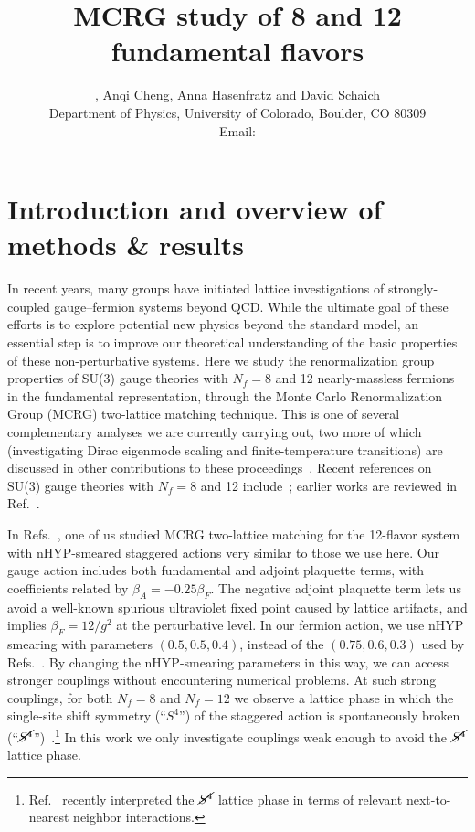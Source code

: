 \documentclass{PoS}
\title{MCRG study of 8 and 12 fundamental flavors}
\author{\speaker{Gregory Petropoulos}, Anqi Cheng, Anna Hasenfratz and David Schaich \\
  Department of Physics, University of Colorado, Boulder, CO 80309 \\
  Email: \email{gregory.petropoulos@colorado.edu}
}
\newcommand{\be}{\ensuremath{\beta} }
\newcommand{\Sb}{\ensuremath{\cancel{S^4}} }
\newcommand{\refcite}[1]{Ref.~\cite{#1}}
\begin{document}
\section{Introduction and overview of methods \& results} %
In recent years, many groups have initiated lattice investigations of strongly-coupled gauge--fermion systems beyond QCD.
While the ultimate goal of these efforts is to explore potential new physics beyond the standard model, an essential step is to improve our theoretical understanding of the basic properties of these non-perturbative systems.
Here we study the renormalization group properties of SU(3) gauge theories with $N_f = 8$ and 12 nearly-massless fermions in the fundamental representation, through the Monte Carlo Renormalization Group (MCRG) two-lattice matching technique.
This is one of several complementary analyses we are currently carrying out, two more of which (investigating Dirac eigenmode scaling and finite-temperature transitions) are discussed in other contributions to these proceedings~\cite{Hasenfratz:2012fp, Schaich:2012fr}.
Recent references on SU(3) gauge theories with $N_f = 8$ and 12 include~\cite{Fodor:2012uw, Fodor:2012et, Aoki:2012eq, Deuzeman:2012ee, Lin:2012iw}; earlier works are reviewed in \refcite{Giedt:2012LAT}.

In Refs.~\cite{Hasenfratz:2011xn, Hasenfratz:2011np}, one of us studied MCRG two-lattice matching for the 12-flavor system with nHYP-smeared staggered actions very similar to those we use here.
Our gauge action includes both fundamental and adjoint plaquette terms, with coefficients related by $\be_A = -0.25\be_F$.
The negative adjoint plaquette term lets us avoid a well-known spurious ultraviolet fixed point caused by lattice artifacts, and implies $\be_F = 12 / g^2$ at the perturbative level.
In our fermion action, we use nHYP smearing with parameters $(0.5, 0.5, 0.4)$, instead of the $(0.75, 0.6, 0.3)$ used by Refs.~\cite{Hasenfratz:2011xn, Hasenfratz:2011np}.
By changing the nHYP-smearing parameters in this way, we can access stronger couplings without encountering numerical problems.
At such strong couplings, for both $N_f = 8$ and $N_f = 12$ we observe a lattice phase in which the single-site shift symmetry (``$S^4$'') of the staggered action is spontaneously broken (``$\Sb$'')~\cite{Cheng:2011ic, Schaich:2012fr}.\footnote{\refcite{Deuzeman:2012ee} recently interpreted the \Sb lattice phase in terms of relevant next-to-nearest neighbor interactions.}
In this work we only investigate couplings weak enough to avoid the \Sb lattice phase.
\end{document}

